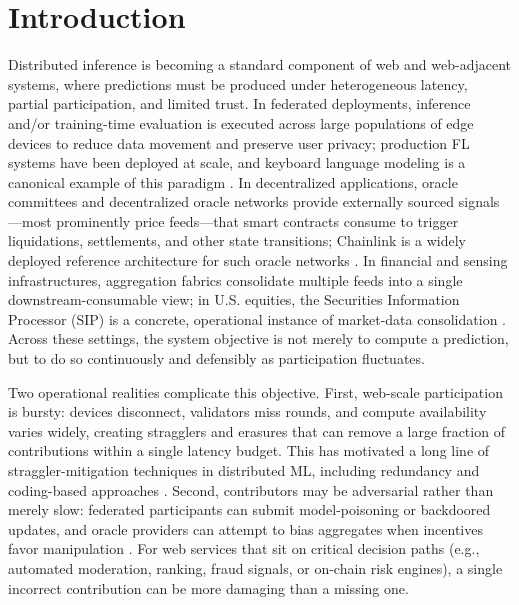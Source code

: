 \documentclass[sigconf]{acmart}
\begin{document}

\maketitle

\section{Introduction}
Distributed inference is becoming a standard component of web and web-adjacent systems, where predictions must be produced under heterogeneous latency, partial participation, and limited trust. In federated deployments, inference and/or training-time evaluation is executed across large populations of edge devices to reduce data movement and preserve user privacy; production FL systems have been deployed at scale, and keyboard language modeling is a canonical example of this paradigm \cite{mcmahan2017fedavg,bonawitz2019scale,hard2018keyboard}. In decentralized applications, oracle committees and decentralized oracle networks provide externally sourced signals---most prominently price feeds---that smart contracts consume to trigger liquidations, settlements, and other state transitions; Chainlink is a widely deployed reference architecture for such oracle networks \cite{ellis2017chainlink,breidenbach2021chainlink2}. In financial and sensing infrastructures, aggregation fabrics consolidate multiple feeds into a single downstream-consumable view; in U.S. equities, the Securities Information Processor (SIP) is a concrete, operational instance of market-data consolidation \cite{ctaSIP}. Across these settings, the system objective is not merely to compute a prediction, but to do so continuously and defensibly as participation fluctuates.

Two operational realities complicate this objective. First, web-scale participation is bursty: devices disconnect, validators miss rounds, and compute availability varies widely, creating stragglers and erasures that can remove a large fraction of contributions within a single latency budget. This has motivated a long line of straggler-mitigation techniques in distributed ML, including redundancy and coding-based approaches \cite{karakus2017straggler}. Second, contributors may be adversarial rather than merely slow: federated participants can submit model-poisoning or backdoored updates, and oracle providers can attempt to bias aggregates when incentives favor manipulation \cite{bagdasaryan2020backdoor,nadler2025oracles}. For web services that sit on critical decision paths (e.g., automated moderation, ranking, fraud signals, or on-chain risk engines), a single incorrect contribution can be more damaging than a missing one.
\end{document}
